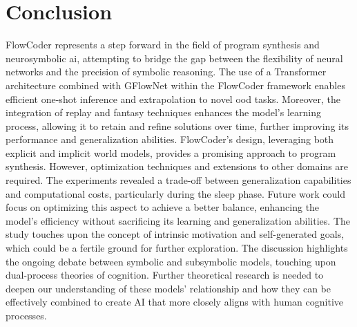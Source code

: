 \section{Conclusion}
FlowCoder represents a step forward in the field of program synthesis and neurosymbolic \acrshort{ai}, attempting to bridge the gap between the flexibility of neural networks and the precision of symbolic reasoning. 
The use of a Transformer architecture combined with GFlowNet within the FlowCoder framework enables efficient one-shot inference and extrapolation to novel \acrlong{ood} tasks. Moreover, the integration of replay and fantasy techniques enhances the model's learning process, allowing it to retain and refine solutions over time, further improving its performance and generalization abilities. FlowCoder's design, leveraging both explicit and implicit world models, provides a promising approach to program synthesis. However, optimization techniques and extensions to other domains are required. The experiments revealed a trade-off between generalization capabilities and computational costs, particularly during the sleep phase. Future work could focus on optimizing this aspect to achieve a better balance, enhancing the model's efficiency without sacrificing its learning and generalization abilities. The study touches upon the concept of intrinsic motivation and self-generated goals, which could be a fertile ground for further exploration. The discussion highlights the ongoing debate between symbolic and subsymbolic models, touching upon dual-process theories of cognition. Further theoretical research is needed to deepen our understanding of these models' relationship and how they can be effectively combined to create AI that more closely aligns with human cognitive processes.





















